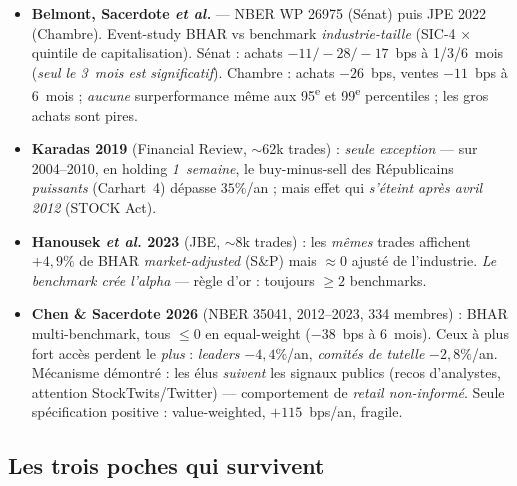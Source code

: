 \documentclass[11pt,a4paper]{article}
\begin{document}
\begin{itemize}
  \item \textbf{Belmont, Sacerdote \textit{et al.}} --- NBER WP 26975 (Sénat) puis JPE 2022 (Chambre).
  Event-study BHAR vs benchmark \emph{industrie-taille} (SIC-4 $\times$ quintile de capitalisation). Sénat :
  achats $-11 / -28 / -17$~bps à 1/3/6~mois (\emph{seul le 3~mois est significatif}). Chambre : achats
  $-26$~bps, ventes $-11$~bps à 6~mois ; \emph{aucune} surperformance même aux 95\textsuperscript{e} et
  99\textsuperscript{e} percentiles ; les gros achats sont pires.
  \item \textbf{Karadas 2019} (Financial Review, $\sim$62k trades) : \emph{seule exception} --- sur
  2004--2010, en holding \emph{1~semaine}, le buy-minus-sell des Républicains \emph{puissants} (Carhart~4)
  dépasse $35\%$/an ; mais effet qui \emph{s'éteint après avril 2012} (STOCK Act).
  \item \textbf{Hanousek \textit{et al.} 2023} (JBE, $\sim$8k trades) : les \emph{mêmes} trades affichent
  $+4{,}9\%$ de BHAR \emph{market-adjusted} (S\&P) mais $\approx 0$ ajusté de l'industrie. \emph{Le benchmark
  crée l'alpha} --- règle d'or : toujours $\geq 2$ benchmarks.
  \item \textbf{Chen \& Sacerdote 2026} (NBER 35041, 2012--2023, 334 membres) : BHAR multi-benchmark, tous
  $\leq 0$ en equal-weight ($-38$~bps à 6~mois). Ceux à plus fort accès perdent le \emph{plus} :
  \emph{leaders} $-4{,}4\%$/an, \emph{comités de tutelle} $-2{,}8\%$/an. Mécanisme démontré : les élus
  \emph{suivent} les signaux publics (recos d'analystes, attention StockTwits/Twitter) --- comportement de
  \emph{retail non-informé}. Seule spécification positive : value-weighted, $+115$~bps/an, fragile.
\end{itemize}

\subsection{Les trois poches qui survivent}
\end{document}
